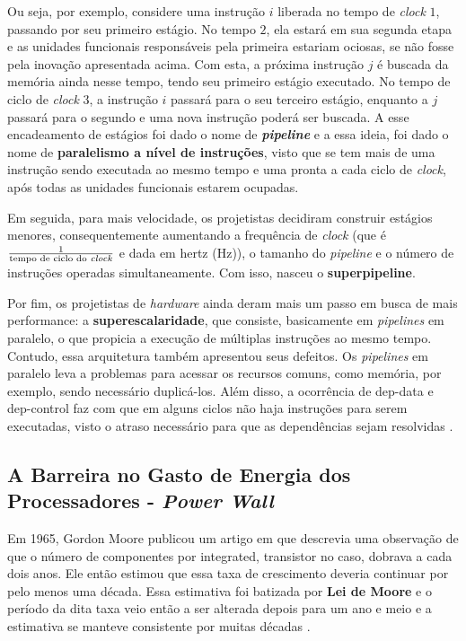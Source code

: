 Ou seja, por exemplo,
considere uma instrução $i$ liberada no tempo de \textit{clock} $1$,
passando por seu primeiro estágio. No tempo $2$, ela estará em sua
segunda etapa e as unidades funcionais responsáveis pela primeira
estariam ociosas, se não fosse pela inovação apresentada acima. Com
esta, a próxima instrução $j$ é buscada da memória ainda nesse tempo, tendo
seu primeiro estágio executado. No tempo de ciclo de \textit{clock} 3,
a instrução $i$ passará para o seu terceiro estágio, enquanto a $j$
passará para o segundo e uma nova instrução poderá ser buscada. A esse 
encadeamento de estágios foi dado o nome de \textbf{\textit{pipeline}} e a essa
ideia, foi dado o nome de \textbf{paralelismo a nível de instruções},
visto que se tem mais de uma instrução sendo executada ao mesmo tempo e
uma pronta a cada ciclo de \textit{clock}, após todas as unidades funcionais
estarem ocupadas.

Em seguida, para mais velocidade, os projetistas decidiram construir estágios menores,
consequentemente aumentando a frequência de \textit{clock} (que é
$\frac{1}{\text{tempo de ciclo do \textit{clock}}}$
e dada em hertz (Hz)), o tamanho do \textit{pipeline} e o número de
instruções operadas simultaneamente. Com isso, nasceu o \textbf{superpipeline}.

Por fim, os projetistas de \textit{hardware} ainda deram mais um
passo em busca de mais performance: a \textbf{superescalaridade},
que consiste, basicamente em \textit{pipelines} em paralelo, o que
propicia a execução de múltiplas instruções ao mesmo tempo. Contudo, essa arquitetura 
também apresentou seus defeitos. Os
\textit{pipelines} em paralelo leva a problemas para acessar os recursos comuns,
como memória, por exemplo, sendo necessário duplicá-los. Além disso,
a ocorrência de \gls{dep-data} e \gls{dep-control} faz com que em alguns ciclos não haja
instruções para serem executadas, visto o atraso necessário para que as dependências
sejam resolvidas \cite{slide:adv-microarch}.

\subsection{A Barreira no Gasto de Energia dos Processadores - \textit{Power Wall}}

Em 1965, Gordon Moore publicou um artigo em que descrevia uma observação de que o
número de componentes por \gls{integrated}, \gls{transistor} no caso, dobrava a cada 
dois anos. Ele então estimou que essa
taxa de crescimento deveria continuar por pelo menos uma década. Essa estimativa foi
batizada por \textbf{Lei de Moore} e o período da dita
taxa veio então a ser alterada depois para um ano e meio e a estimativa se manteve
consistente por muitas décadas \cite{wiki:moorelaw}.

